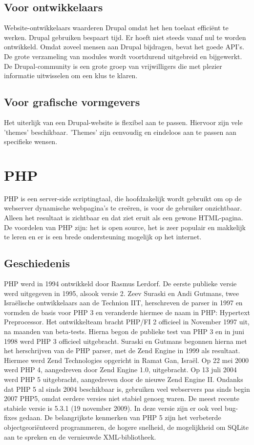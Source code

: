 \subsection{Voor ontwikkelaars}
Website-ontwikkelaars waarderen Drupal omdat het hen toelaat effici\"ent te
werken. Drupal gebruiken bespaart tijd. Er hoeft niet steeds vanaf nul te worden ontwikkeld. 
Omdat zoveel mensen aan Drupal bijdragen, bevat het goede API's. De grote verzameling van 
modules wordt voortdurend uitgebreid en bijgewerkt. De Drupal-community is een grote groep 
van vrijwilligers die met plezier informatie uitwisselen om een klus te klaren.

\subsection{Voor grafische vormgevers}
Het uiterlijk van een Drupal-website is flexibel aan te passen. Hiervoor zijn
vele 'themes' beschikbaar. 'Themes' zijn eenvoudig en eindeloos aan te passen aan specifieke wensen.


\section{PHP}
PHP is een server-side scriptingtaal, die
hoofdzakelijk wordt gebruikt om op de webserver dynamische webpagina's te cre\"eren, is voor de gebruiker
onzichtbaar. Alleen het resultaat is zichtbaar en dat ziet eruit als een gewone HTML-pagina. 
De voordelen van PHP zijn: het is open source, het is zeer populair en makkelijk 
te leren en er is een brede ondersteuning mogelijk op het internet.
\subsection{Geschiedenis}
PHP werd in 1994 ontwikkeld door Rasmus Lerdorf. De eerste publieke versie werd uitgegeven in 1995, 
alsook versie 2. Zeev Suraski en Andi Gutmans, twee Isra\"elische ontwikkelaars
aan de Technion IIT, herschreven de parser in 1997 en vormden de basis voor PHP 3 en veranderde hiermee de naam in PHP: 
Hypertext Preprocessor. Het ontwikkelteam bracht PHP/FI 2 officieel in November 1997 uit, na maanden van beta-tests. 
Hierna begon de publieke test van PHP 3 en in juni 1998 werd PHP 3 officieel uitgebracht. Suraski en Gutmans begonnen 
hierna met het herschrijven van de PHP parser, met de Zend Engine in 1999 als resultaat. Hiermee werd Zend Technologies 
opgericht in Ramat Gan, Isra\"el.
Op 22 mei 2000 werd PHP 4, aangedreven door Zend Engine 1.0, uitgebracht. Op 13 juli 2004 werd PHP 5 uitgebracht, 
aangedreven door de nieuwe Zend Engine II.
Ondanks dat PHP 5 al sinds 2004 beschikbaar is, gebruiken veel webservers pas sinds begin 2007 PHP5, omdat eerdere versies 
niet stabiel genoeg waren. De meest recente stabiele versie is 5.3.1 (19 november 2009). In deze versie zijn er ook veel 
bug-fixes gedaan. De belangrijkste kenmerken van PHP 5 zijn het verbeterde objectgeori\"enteerd programmeren, de hogere 
snelheid, de mogelijkheid om SQLite aan te spreken en de vernieuwde XML-bibliotheek.
